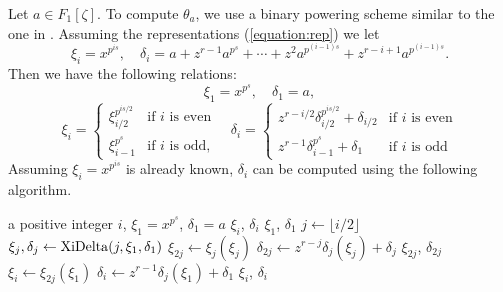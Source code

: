\documentclass[12pt]{article}
\theoremstyle{plain}
\theoremstyle{definition}
\newcounter{algorithm}
\begin{document}
Let $a \in F_1[\zeta]$. To compute $\theta_a$, we use a binary powering scheme similar to the one in \cite{doliskanischost2011}.
Assuming the representations (\ref{equation:rep}) we let 
\[
\xi_i = x^{p^{is}}, \quad
\delta_i = a + z^{r - 1}a^{p^s} + \cdots + z^2a^{p^{(i - 1)s}} + z^{r - i + 1} a^{p^{(i - 1)s}}.
\]
Then we have the following relations:
\[\xi_1 = x^{p^s}, \quad \delta_1 = a, \]
\[
\xi_i =
\begin{cases}
\xi_{i / 2}^{p^{is / 2}} & \text{if $i$ is even}  \\
\xi_{i - 1}^{p^s} & \text{if $i$ is odd,}
\end{cases} \quad
\delta_i=
\begin{cases}
	z^{r - i / 2}\delta_{i / 2}^{p^{is / 2}} + \delta_{i / 2} & \text{if $i$ is even} \\
	z^{r - 1}\delta_{i - 1}^{p^s} + \delta_1 & \text{if $i$ is odd}
\end{cases}
\]
Assuming $\xi_i = x^{p^{is}}$ is already known, $\delta_i$ can be computed using the following algorithm.

\begin{algorithm}
\label{algorithm:xidelta}
	\begin{algorithmic}[1]
		\REQUIRE a positive integer $i$, $\xi_1 = x^{p^s}$, $\delta_1 = a$
		\ENSURE $\xi_i$, $\delta_i$
			\RETURN $\xi_1$, $\delta_1$
		\ENDIF
		\STATE $j \leftarrow \lfloor i/2\rfloor$
		\STATE $\xi_{j}, \delta_j \leftarrow {\rm XiDelta}(j,\xi_1,\delta_1)$ 
		\STATE\label{step:xi} $\xi_{2j} \leftarrow \xi_j(\xi_j)$
		\STATE\label{step:delta} $\delta_{2j} \leftarrow z^{r - j}\delta_j(\xi_j) + \delta_j$
			\RETURN $\xi_{2j}$, $\delta_{2j}$
		\ENDIF
		\STATE $\xi_i \leftarrow \xi_{2j}(\xi_1)$
		\STATE $\delta_i \leftarrow z^{r - 1}\delta_j(\xi_1) + \delta_1$
		\RETURN $\xi_i$, $\delta_i$
	\end{algorithmic}
\end{algorithm}
\end{document}
